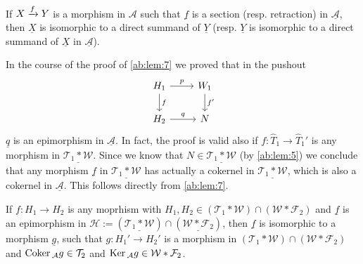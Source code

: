 \begin{lemma}
  If $X\xrightarrow{f}Y$ is a morphism in $\mathcal{A}$ such that $\underline{f}$ is a section
  (resp. retraction) in $\underline{\mathcal{A}}$, then $\underline{X}$ is isomorphic
  to a direct summand of $\underline{Y}$ (resp. $\underline{Y}$ is isomorphic to a direct summand
  of $\underline{X}$ in $\underline{\mathcal{A}}$).
\end{lemma}

\begin{rmk}
  In the course of the proof of \cref{ab:lem:7} we proved that in the pushout
  \begin{equation*}
    \begin{tikzcd}
      H_1\arrow{r}{p}\arrow{d}{f}
        & W_1\arrow{d}{f'}\\
      H_2\arrow{r}{q}
        & N
    \end{tikzcd}
  \end{equation*}
  $\underline{q}$ is an epimorphism in $\underline{\mathcal{A}}$. In fact, the proof is valid
  also if $f:\widehat{T}_1\to \widehat{T}_1'$ is any morphism in $\underline{\mathcal{T}_1\ast\mathcal{W}}$.
  Since we know that $N\in\underline{\mathcal{T}_1\ast\mathcal{W}}$ (by \cref{ab:lem:5})
  we conclude that any morphism $\underline{f}$ in $\underline{\mathcal{T}_1\ast\mathcal{W}}$
  has actually a cokernel in $\underline{\mathcal{T}_1\ast\mathcal{W}}$, which is also
  a cokernel in $\underline{\mathcal{A}}$. This follows directly from \cref{ab:lem:7}.
\end{rmk}

\begin{lemma}\label{ab:lem:10}
  If $f:H_1\to H_2$ is any moprhism with $H_1,H_2\in(\mathcal{T}_1\ast\mathcal{W})\cap(\mathcal{W}\ast\mathcal{F}_2)$
  and $\underline{f}$ is an epimorphism in $\mathcal{H}:=(\underline{\mathcal{T}_1\ast\mathcal{W}})\cap(\underline{\mathcal{W}\ast\mathcal{F}_2})$,
  then $\underline{f}$ is isomorphic  to a morphism $\underline{g}$, such that
  $g:H_1'\to H_2'$ is a morphism in $(\mathcal{T}_1\ast\mathcal{W})\cap(\mathcal{W}\ast\mathcal{F}_2)$ and
  $\mathrm{\textup{Coker\,}}_\mathcal{A} g \in\mathcal{T}_2$ and $\mathrm{\textup{Ker\,}}_\mathcal{A} g\in\mathcal{W}\ast\mathcal{F}_2$.
\end{lemma}

